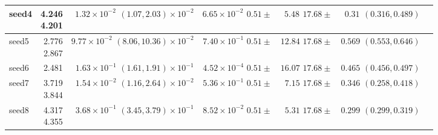 \begin{table}
\begin{tabular}{lrrrrrr}
\midrule
\specialcell{seed4 \\ \vphantom{fg}}  & \specialcell{4.246\\4.201} &       \specialcell{$1.32 \times 10^{-2}$\\$(1.07, 2.03) \times 10^{-2}$}  &  \specialcell{$6.65 \times 10^{-2}$\\ $0.51 \pm$}  &  \specialcell{$5.48$ \\ $17.68 \pm$}  &  \specialcell{$0.31$ \\ $(0.316, 0.489)$} \\
\midrule
\specialcell{seed5 \\ \vphantom{fg}}  & \specialcell{2.776\\2.867} &       \specialcell{$9.77 \times 10^{-2}$\\$(8.06, 10.36) \times 10^{-2}$}  &  \specialcell{$7.40 \times 10^{-1}$\\ $0.51 \pm$}  &  \specialcell{$12.84$ \\ $17.68 \pm$}  &  \specialcell{$0.569$ \\ $(0.553, 0.646)$} \\
\midrule
\specialcell{seed6 \\ \vphantom{fg}}  & \specialcell{2.481\\\vphantom{fg}} &       \specialcell{$1.63 \times 10^{-1}$\\$(1.61, 1.91) \times 10^{-1}$}  &  \specialcell{$4.52 \times 10^{-4}$\\ $0.51 \pm$}  &  \specialcell{$16.07$ \\ $17.68 \pm$}  &  \specialcell{$0.465$ \\ $(0.456, 0.497)$} \\
\midrule
\specialcell{seed7 \\ \vphantom{fg}}  & \specialcell{3.719\\3.844} &       \specialcell{$1.54 \times 10^{-2}$\\$(1.16, 2.64) \times 10^{-2}$}  &  \specialcell{$5.36 \times 10^{-1}$\\ $0.51 \pm$}  &  \specialcell{$7.15$ \\ $17.68 \pm$}  &  \specialcell{$0.346$ \\ $(0.258, 0.418)$} \\
\midrule
\specialcell{seed8 \\ \vphantom{fg}}  & \specialcell{4.317\\4.355} &       \specialcell{$3.68 \times 10^{-1}$\\$(3.45, 3.79) \times 10^{-1}$}  &  \specialcell{$8.52 \times 10^{-2}$\\ $0.51 \pm$}  &  \specialcell{$5.31$ \\ $17.68 \pm$}  &  \specialcell{$0.299$ \\ $(0.299, 0.319)$} \\

\end{tabular}
\end{table}
